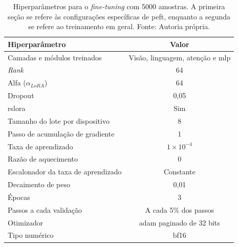 \clearpage

\begin{table}[ht]
    \centering
    \begin{tabular}{l|c}
        \hline
        Hiperparâmetro                             & Valor                                  \\ \hline
        Camadas e módulos treinados                & Visão, linguagem, atenção e \ac{mlp}   \\
        \textit{Rank}                              & 64                                     \\
        Alfa (\begin{math}\alpha_{LoRA}\end{math}) & 64                                     \\
        Dropout                                    & 0,05                                   \\
        \ac{rslora}                                & Sim                                    \\ \hline
        Tamanho do lote por dispositivo            & 8                                      \\
        Passo de acumulação de gradiente           & 1                                      \\
        Taxa de aprendizado                        & \begin{math}1 \times 10^{-4}\end{math} \\
        Razão de aquecimento                       & 0                                      \\
        Escalonador da taxa de aprendizado         & Constante                              \\
        Decaimento de peso                         & 0,01                                   \\
        Épocas                                     & 3                                      \\
        Passos a cada validação                    & A cada 5\% dos passos                  \\
        Otimizador                                 & \ac{adam} paginado de 32 bits          \\
        Tipo numérico                              & \ac{bf16}                              \\ \hline
    \end{tabular}
    \label{tab:qlora_5000_config}
    \caption{Hiperparâmetros para o \textit{fine-tuning} com 5000 amostras. A primeira seção se refere às
    configurações específicas de \ac{peft}, enquanto a segunda se refere ao treinamento em geral. Fonte: Autoria
    própria.}
\end{table}


